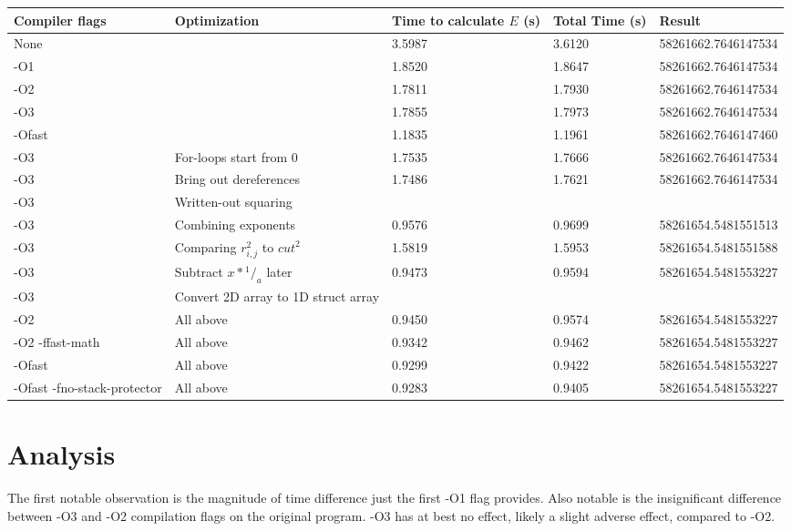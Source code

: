 \documentclass[12pt]{article}
\begin{document}
	\singlespacing
	\begin{center}
	\begin{tabular}{| p{3cm} | p{4cm} | p{1.5cm} | p{1.5cm} | l |}
	\hline
	Compiler flags & Optimization\footnotemark[1] & Time to calculate $E$ (s) & Total Time (s) & Result \\ \hline
	None & & 3.5987 & 3.6120 & 58261662.7646147534 \\ \hline
	-O1 & & 1.8520 & 1.8647 & 58261662.7646147534 \\ \hline
	-O2 & & 1.7811 & 1.7930 & 58261662.7646147534 \\ \hline
	-O3 & & 1.7855 & 1.7973 & 58261662.7646147534 \\ \hline
	-Ofast & & 1.1835 & 1.1961 & 58261662.7646147460 \\ \hline
	-O3 & For-loops start from 0 & 1.7535 & 1.7666 & 58261662.7646147534 \\ \hline
	-O3 & Bring out dereferences & 1.7486 & 1.7621 & 58261662.7646147534 \\ \hline
	-O3 & Written-out squaring & & & \\ \hline
	-O3 & Combining exponents & 0.9576 & 0.9699 & 58261654.5481551513 \\ \hline
	-O3 & Comparing $r_{i,j}^2$ to $cut^2$ & 1.5819 & 1.5953 & 58261654.5481551588 \\ \hline
	-O3 & Subtract $x*{^1/_a}$ later & 0.9473 & 0.9594 & 58261654.5481553227 \\ \hline
	-O3 & Convert 2D array to 1D struct array & & & \\ \hline
	-O2 & All above & 0.9450 & 0.9574 & 58261654.5481553227 \\ \hline
	-O2 -ffast-math & All above & 0.9342 & 0.9462 & 58261654.5481553227 \\ \hline
	-Ofast & All above & 0.9299 & 0.9422 & 58261654.5481553227 \\ \hline
	-Ofast -fno-stack-protector & All above & 0.9283 & 0.9405 & 58261654.5481553227 \\ \hline
	\end{tabular}
	\end{center}
	\doublespacing

	\section{Analysis}

	The first notable observation is the magnitude of time difference just the first -O1 flag provides. 
	Also notable is the insignificant difference between -O3 and -O2 compilation flags on the original program.
	-O3 has at best no effect, likely a slight adverse effect, compared to -O2. 
\end{document}
